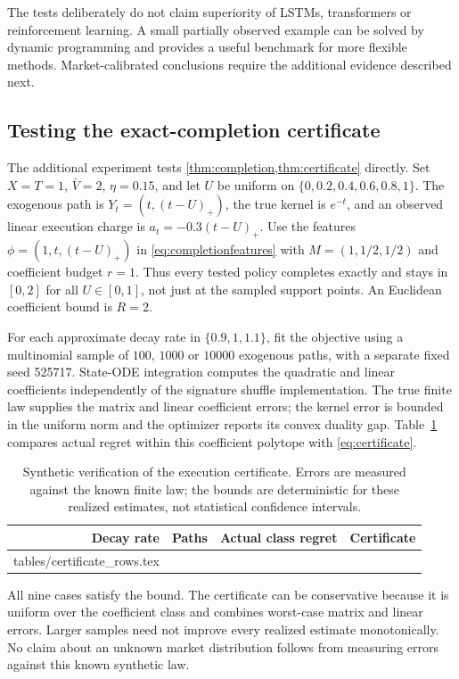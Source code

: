 \documentclass[11pt]{article}
\makeatletter
\numberwithin{equation}{section}
\theoremstyle{definition}
\theoremstyle{remark}
\theoremstyle{definition}
\newcommand{\inputtable}[1]{\@@input#1 }
\makeatother
\begin{document}
The tests deliberately do not claim superiority of LSTMs, transformers or
reinforcement learning. A small partially observed example can be solved by
dynamic programming and provides a useful benchmark for more flexible methods.
Market-calibrated conclusions require the additional evidence described next.

\subsection{Testing the exact-completion certificate}\label{sec:certexperiment}
The additional experiment tests \cref{thm:completion,thm:certificate} directly.
Set $X=T=1$, $\bar V=2$, $\eta=0.15$, and let $U$ be uniform on
$\{0,0.2,0.4,0.6,0.8,1\}$. The exogenous path is
$Y_t=(t,(t-U)_+)$, the true kernel is $e^{-t}$, and an observed linear
execution charge is $a_t=-0.3(t-U)_+$. Use the features
$\phi=(1,t,(t-U)_+)$ in \eqref{eq:completionfeatures} with
$M=(1,1/2,1/2)$ and coefficient budget $r=1$. Thus every tested policy
completes exactly and stays in $[0,2]$ for all $U\in[0,1]$, not just at
the sampled support points. An Euclidean coefficient bound is $R=2$.

For each approximate decay rate in $\{0.9,1,1.1\}$, fit the objective using
a multinomial sample of $100$, $1000$ or $10000$ exogenous paths, with a
separate fixed seed 525717. State-ODE integration computes the quadratic and
linear coefficients independently of the signature shuffle implementation.
The true finite law supplies the matrix and linear coefficient errors; the
kernel error is bounded in the uniform norm and the optimizer reports its
convex duality gap. Table~\ref{tab:certificate} compares actual regret within
this coefficient polytope with \eqref{eq:certificate}.

\begin{table}[tb]
\centering\small
\caption{Synthetic verification of the execution certificate. Errors are
measured against the known finite law; the bounds are deterministic for these
realized estimates, not statistical confidence intervals.}
\label{tab:certificate}
\begin{tabular}{rrrr}
\toprule Decay rate & Paths & Actual class regret & Certificate \\\midrule
\inputtable{tables/certificate_rows.tex}
\bottomrule
\end{tabular}
\end{table}

All nine cases satisfy the bound. The certificate can be conservative because
it is uniform over the coefficient class and combines worst-case matrix and
linear errors. Larger samples need not improve every realized estimate
monotonically. No claim about an unknown market distribution follows from
measuring errors against this known synthetic law.
\end{document}
